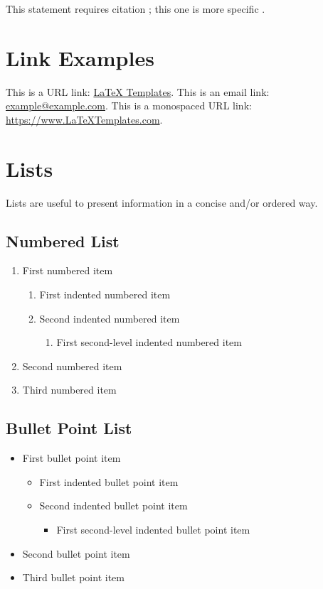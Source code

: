 \documentclass[
	11pt, %
	fleqn, %
	a4paper, %
]{LegrandOrangeBook}
\begin{document}
This statement requires citation \cite{Smith:2022jd}; this one is more specific \cite[162]{Smith:2021qr}.


\section{Link Examples}

This is a URL link: \href{https://www.latextemplates.com}{LaTeX Templates}. This is an email link: \href{mailto:example@example.com}{example@example.com}. This is a monospaced URL link: \url{https://www.LaTeXTemplates.com}.


\section{Lists}

Lists are useful to present information in a concise and/or ordered way.

\subsection{Numbered List}

\begin{enumerate}
	\item First numbered item
	\begin{enumerate}
		\item First indented numbered item
		\item Second indented numbered item
		\begin{enumerate}
			\item First second-level indented numbered item
		\end{enumerate}
	\end{enumerate}
	\item Second numbered item
	\item Third numbered item
\end{enumerate}

\subsection{Bullet Point List}

\begin{itemize}
	\item First bullet point item
	\begin{itemize}
		\item First indented bullet point item
		\item Second indented bullet point item
		\begin{itemize}
			\item First second-level indented bullet point item
		\end{itemize}
	\end{itemize}
	\item Second bullet point item
	\item Third bullet point item
\end{itemize}
\end{document}
